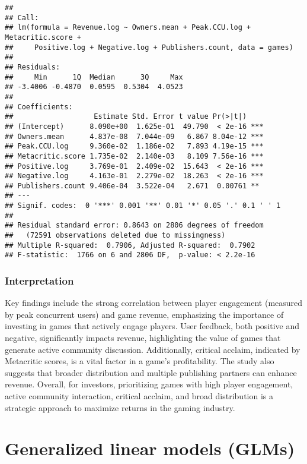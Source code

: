 \documentclass[
]{article}
\begin{document}
\begin{verbatim}
## 
## Call:
## lm(formula = Revenue.log ~ Owners.mean + Peak.CCU.log + Metacritic.score + 
##     Positive.log + Negative.log + Publishers.count, data = games)
## 
## Residuals:
##     Min      1Q  Median      3Q     Max 
## -3.4006 -0.4870  0.0595  0.5304  4.0523 
## 
## Coefficients:
##                   Estimate Std. Error t value Pr(>|t|)    
## (Intercept)      8.090e+00  1.625e-01  49.790  < 2e-16 ***
## Owners.mean      4.837e-08  7.044e-09   6.867 8.04e-12 ***
## Peak.CCU.log     9.360e-02  1.186e-02   7.893 4.19e-15 ***
## Metacritic.score 1.735e-02  2.140e-03   8.109 7.56e-16 ***
## Positive.log     3.769e-01  2.409e-02  15.643  < 2e-16 ***
## Negative.log     4.163e-01  2.279e-02  18.263  < 2e-16 ***
## Publishers.count 9.406e-04  3.522e-04   2.671  0.00761 ** 
## ---
## Signif. codes:  0 '***' 0.001 '**' 0.01 '*' 0.05 '.' 0.1 ' ' 1
## 
## Residual standard error: 0.8643 on 2806 degrees of freedom
##   (72591 observations deleted due to missingness)
## Multiple R-squared:  0.7906, Adjusted R-squared:  0.7902 
## F-statistic:  1766 on 6 and 2806 DF,  p-value: < 2.2e-16
\end{verbatim}

\hypertarget{interpretation-1}{%
\subsubsection{Interpretation}\label{interpretation-1}}

Key findings include the strong correlation between player engagement
(measured by peak concurrent users) and game revenue, emphasizing the
importance of investing in games that actively engage players. User
feedback, both positive and negative, significantly impacts revenue,
highlighting the value of games that generate active community
discussion. Additionally, critical acclaim, indicated by Metacritic
scores, is a vital factor in a game's profitability. The study also
suggests that broader distribution and multiple publishing partners can
enhance revenue. Overall, for investors, prioritizing games with high
player engagement, active community interaction, critical acclaim, and
broad distribution is a strategic approach to maximize returns in the
gaming industry.

\hypertarget{generalized-linear-models-glms}{%
\section{Generalized linear models
(GLMs)}\label{generalized-linear-models-glms}}
\end{document}
